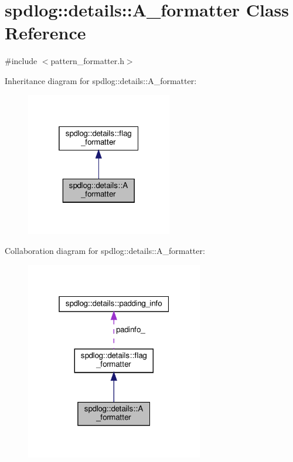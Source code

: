 \hypertarget{classspdlog_1_1details_1_1_a__formatter}{}\section{spdlog\+:\+:details\+:\+:A\+\_\+formatter Class Reference}
\label{classspdlog_1_1details_1_1_a__formatter}


{\ttfamily \#include $<$pattern\+\_\+formatter.\+h$>$}



Inheritance diagram for spdlog\+:\+:details\+:\+:A\+\_\+formatter\+:
\nopagebreak
\begin{figure}[H]
\begin{center}
\leavevmode
\includegraphics[width=181pt]{classspdlog_1_1details_1_1_a__formatter__inherit__graph}
\end{center}
\end{figure}


Collaboration diagram for spdlog\+:\+:details\+:\+:A\+\_\+formatter\+:
\nopagebreak
\begin{figure}[H]
\begin{center}
\leavevmode
\includegraphics[width=220pt]{classspdlog_1_1details_1_1_a__formatter__coll__graph}
\end{center}
\end{figure}
